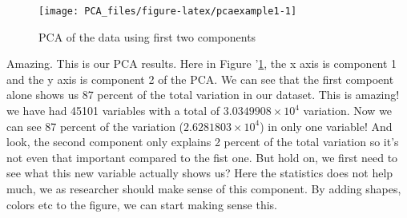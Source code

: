 \documentclass[
]{book}
\newenvironment{Shaded}{\begin{snugshade}}{\end{snugshade}}
\newcommand{\CommentTok}[1]{\textcolor[rgb]{0.56,0.35,0.01}{\textit{#1}}}
\newcommand{\DataTypeTok}[1]{\textcolor[rgb]{0.13,0.29,0.53}{#1}}
\newcommand{\DecValTok}[1]{\textcolor[rgb]{0.00,0.00,0.81}{#1}}
\newcommand{\KeywordTok}[1]{\textcolor[rgb]{0.13,0.29,0.53}{\textbf{#1}}}
\newcommand{\NormalTok}[1]{#1}
\newcommand{\OperatorTok}[1]{\textcolor[rgb]{0.81,0.36,0.00}{\textbf{#1}}}
\newcommand{\StringTok}[1]{\textcolor[rgb]{0.31,0.60,0.02}{#1}}
\theoremstyle{definition}
\theoremstyle{definition}
\theoremstyle{definition}
\theoremstyle{remark}
\begin{document}
\begin{Shaded}
\end{Shaded}

\begin{figure}

{\centering \texttt{[image: PCA\_files/figure-latex/pcaexample1-1]} 

}

\caption{PCA of the data using first two components}\label{fig:pcaexample1}
\end{figure}

Amazing. This is our PCA results. Here in Figure '\ref{fig:pcaexample1}, the x axis is component 1 and the y axis is component 2 of the PCA. We can see that the first compoent alone shows us 87 percent of the total variation in our dataset. This is amazing! we have had 45101 variables with a total of \ensuremath{3.0349908\times 10^{4}} variation. Now we can see 87 percent of the variation (\ensuremath{2.6281803\times 10^{4}}) in only one variable! And look, the second component only explains 2 percent of the total variation so it's not even that important compared to the fist one. But hold on, we first need to see what this new variable actually shows us? Here the statistics does not help much, we as researcher should make sense of this component. By adding shapes, colors etc to the figure, we can start making sense this.
\end{document}
